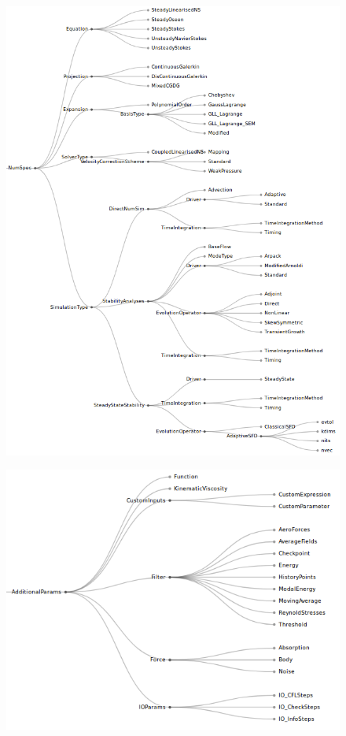 \documentclass[11pt, a4paper]{report}
\begin{document}
\begin{figure}[htb!]
 \centering
 \includegraphics[width=1\linewidth,  clip=true, trim = .1cm 0cm 0cm 0cm]{numericalSpecification}
 \label{fig:numericalSpecification}
\end{figure}

\begin{figure}[tb!]
 \centering
 \includegraphics[width=1\linewidth,  clip=true, trim = .2cm 0cm 0cm 0cm]{AdditionalParameters}
 \label{fig:problemSpecification}
\end{figure}
\end{document}
